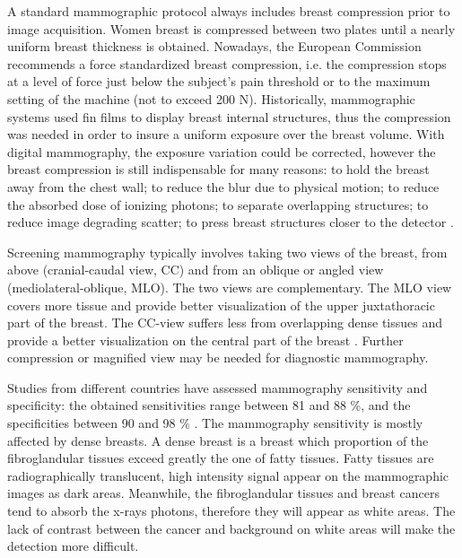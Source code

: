 A standard mammographic protocol always includes breast compression prior to image acquisition. Women breast is compressed between two plates until a nearly uniform breast thickness is obtained. Nowadays, the European Commission recommends a force standardized breast compression, i.e. the compression stops at a level of force just below the subject’s pain threshold or to the maximum setting of the machine (not to exceed 200 N). Historically,  mammographic systems used fin films to display breast internal structures, thus the compression was needed in order to insure a uniform exposure over the breast volume. With digital mammography, the exposure variation could be corrected, however the breast compression is still indispensable for many reasons: to hold the breast away from the chest wall; to reduce the blur due to physical motion; to reduce the absorbed dose of ionizing photons; to separate overlapping structures; to reduce image degrading scatter; to press breast structures closer to the detector \citep{kopans2007breast}.

Screening mammography typically involves taking two views of the breast, from above (cranial-caudal view, CC) and from an oblique or angled view (mediolateral-oblique, MLO). The two views are complementary. The MLO view covers more tissue and provide better visualization of the upper juxtathoracic part of the breast. The CC-view suffers less from overlapping dense tissues and provide a better visualization on the central part of the breast \citep{chan_image_1987}.  Further compression or magnified view may be needed for diagnostic mammography.
 
Studies from different countries have assessed mammography sensitivity and specificity: the obtained sensitivities range between 81 and 88 \%, and the specificities between 90 and 98 \% \citep{kemp_comparing_2015,hofvind_sensitivity_2012}. The mammography sensitivity is mostly affected by dense breasts. A dense breast is a breast which proportion of the fibroglandular tissues exceed greatly the one of fatty tissues. Fatty tissues are radiographically translucent, high intensity signal appear on the mammographic images as dark areas. Meanwhile, the fibroglandular tissues and breast cancers tend to absorb the x-rays photons, therefore they will appear as white areas. The lack of contrast between the cancer and background on white areas will make the detection more difficult.      
 

